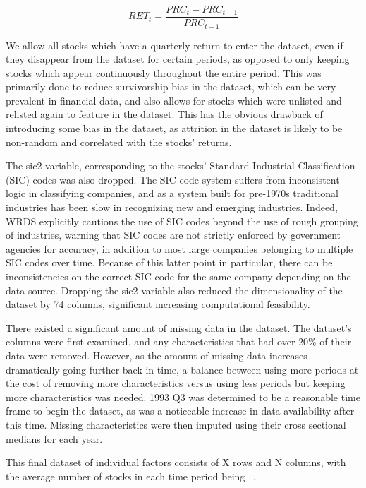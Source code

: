 \documentclass[a4paper, table]{article}
\begin{document}
\begin{equation}
	RET_t = \frac{PRC_t - PRC_{t-1}}{PRC_{t-1}}
\end{equation}

We allow all stocks which have a quarterly return to enter the dataset, even if they disappear from the dataset for certain periods, as opposed to only keeping stocks which appear continuously throughout the entire period. This was primarily done to reduce survivorship bias in the dataset, which can be very prevalent in financial data, and also allows for stocks which were unlisted and relisted again to feature in the dataset. This has the obvious drawback of introducing some bias in the dataset, as attrition in the dataset is likely to be non-random and correlated with the stocks' returns. 

The sic2 variable, corresponding to the stocks' Standard Industrial Classification (SIC) codes was also dropped. The SIC code system suffers from inconsistent logic in classifying companies, and as a system built for pre-1970s traditional industries has been slow in recognizing new and emerging industries. Indeed, WRDS explicitly cautions the use of SIC codes beyond the use of rough grouping of industries, warning that SIC codes are not strictly enforced by government agencies for accuracy, in addition to most large companies belonging to multiple SIC codes over time. Because of this latter point in particular, there can be inconsistencies on the correct SIC code for the same company depending on the data source. Dropping the sic2 variable also reduced the dimensionality of the dataset by 74 columns, significant increasing computational feasibility.

There existed a significant amount of missing data in the dataset. The dataset's columns were first examined, and any characteristics that had over 20\% of their data were removed. However, as the amount of missing data increases dramatically going further back in time, a balance between using more periods at the cost of removing more characteristics versus using less periods but keeping more characteristics was needed. 1993 Q3 was determined to be a reasonable time frame to begin the dataset, as was a noticeable increase in data availability after this time.  Missing characteristics were then imputed using their cross sectional medians for each year. 

This final dataset of individual factors consists of X rows and N columns, with the average number of stocks in each time period being ~.
\end{document}
